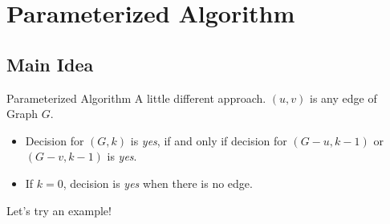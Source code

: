 \documentclass{beamer}
\begin{document}
	\section{Parameterized Algorithm}
	\subsection{Main Idea}
	\begin{frame}{Parameterized Algorithm}
		A little different approach.
		\newline
		\newline
		$(u, v)$ is any edge of Graph $G$. \\
		\begin{itemize}
			\item Decision for $(G, k)$ is \textit{yes}, if and only if decision for $(G-u, k-1)$ or $(G-v, k-1)$ is \textit{yes}. \\
			\item If $k=0$, decision is \textit{yes} when there is no edge. \\
		\end{itemize}
		\pause 	
		Let's try an example! \\
	\end{frame}
	
	
	
\end{document}
